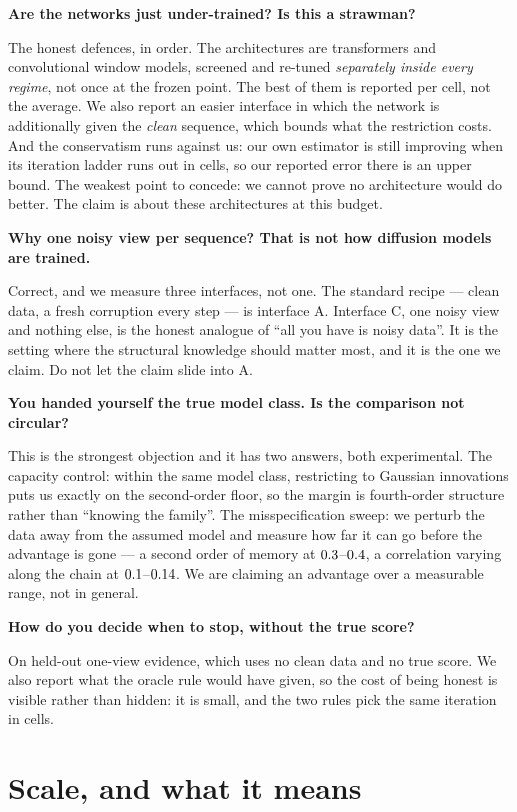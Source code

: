 \documentclass[10pt,a4paper]{article}
\newcommand{\Q}[1]{\par\medskip\noindent\textbf{#1}\par\nopagebreak\vspace{0.15em}\nopagebreak}
\begin{document}
\Q{Are the networks just under-trained? Is this a strawman?}
The honest defences, in order. The architectures are transformers and convolutional window models,
screened and re-tuned \emph{separately inside every regime}, not once at the frozen point. The best
of them is reported per cell, not the average. We also report an easier interface in which the
network is additionally given the \emph{clean} sequence, which bounds what the restriction costs.
And the conservatism runs against us: our own estimator is still improving when its iteration
ladder runs out in \rbEmEvAtCapTotal{} cells, so our reported error there is an upper bound.
The weakest point to concede: we cannot prove no architecture would do better. The claim is about
these architectures at this budget.

\Q{Why one noisy view per sequence? That is not how diffusion models are trained.}
Correct, and we measure three interfaces, not one. The standard recipe --- clean data, a fresh
corruption every step --- is interface A. Interface C, one noisy view and nothing else, is the
honest analogue of ``all you have is noisy data''. It is the setting where the structural knowledge
should matter most, and it is the one we claim. Do not let the claim slide into A.

\Q{You handed yourself the true model class. Is the comparison not circular?}
This is the strongest objection and it has two answers, both experimental. The capacity control:
within the same model class, restricting to Gaussian innovations puts us exactly on the
second-order floor, so the margin is fourth-order structure rather than ``knowing the family''.
The misspecification sweep: we perturb the data away from the assumed model and measure how far it
can go before the advantage is gone --- a second order of memory at $0.3$--$0.4$,
a correlation varying along the chain at $0.1$--$0.14$. We are
claiming an advantage over a measurable range, not in general.

\Q{How do you decide when to stop, without the true score?}
On held-out one-view evidence, which uses no clean data and no true score. We also report what the
oracle rule would have given, so the cost of being honest is visible rather than hidden: it is
small, and the two rules pick the same iteration in \rbEmAgreeRungTotal{} cells.

\section*{Scale, and what it means}
\end{document}
